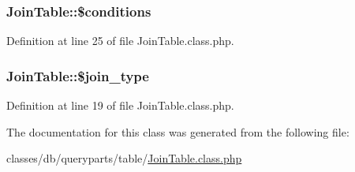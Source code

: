 \subsubsection[{\texorpdfstring{\$conditions}{$conditions}}]{\setlength{\rightskip}{0pt plus 5cm}Join\+Table\+::\$conditions}\hypertarget{classJoinTable_aeaff6b550d1e29eef836ed19a8d65a99}{}\label{classJoinTable_aeaff6b550d1e29eef836ed19a8d65a99}


Definition at line 25 of file Join\+Table.\+class.\+php.

\subsubsection[{\texorpdfstring{\$join\+\_\+type}{$join_type}}]{\setlength{\rightskip}{0pt plus 5cm}Join\+Table\+::\$join\+\_\+type}\hypertarget{classJoinTable_a00c6a8c44beb3b85c9f3a3e5be03fba8}{}\label{classJoinTable_a00c6a8c44beb3b85c9f3a3e5be03fba8}


Definition at line 19 of file Join\+Table.\+class.\+php.



The documentation for this class was generated from the following file\+:\begin{DoxyCompactItemize}
\item 
classes/db/queryparts/table/\hyperlink{JoinTable_8class_8php}{Join\+Table.\+class.\+php}\end{DoxyCompactItemize}
